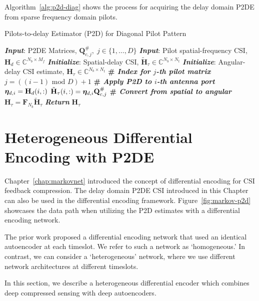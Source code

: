Algorithm~\ref{alg:p2d-diag} shows the process for acquiring the delay domain P2DE from sparse frequency domain pilots.

\begin{algorithm}
    \caption{Pilots-to-delay Estimator (P2D) for Diagonal Pilot Pattern} 
    \label{alg:p2d-diag}
    \begin{algorithmic}[1]
    \State \textbf{\emph{Input}}:
        P2DE Matrices, $\mathbf{Q}_{c,j}^\#,\;
        j\in\{1,\dots, D\}$
    \State \textbf{\emph{Input}}: Pilot spatial-frequency CSI, $\mathbf{H}_d\in\mathbb{C}^{N_b\times M_f}$
    \State \textbf{\emph{Initialize}}: Spatial-delay CSI, $\tilde{\mathbf{H}}_\tau\in\mathbb{C}^{N_b\times N_t}$
   \State \textbf{\emph{Initialize}}: Angular-delay CSI estimate, ${\mathbf{H}}_\tau
              \in\mathbb{C}^{N_b\times N_t}$
        \State \textbf{\# \emph{Index for $j$-th pilot matrix}}
        \State $j = ((i-1) \text{ mod } D) + 1$
        \State \textbf{\# \emph{Apply P2D to $i$-th antenna port}}
        \State ${\boldsymbol{\eta}}_{d,i} = \mathbf{H}_d(i,:)$
        \State $\tilde{{\mathbf{H}}}_{\tau}(i,:) = {\boldsymbol{\eta}}_{d,i}\mathbf{Q}^{\#}_{c,j}$
        \EndFor
        \State \textbf{\# \emph{Convert from spatial to angular}}
        \State ${{\mathbf{H}}}_{\tau}=\mathbf{F}_{N_b}\tilde{{\mathbf{H}}}_{\tau}$
        \State \textbf{\emph{Return}} ${{\mathbf{H}}}_{\tau}$
    \end{algorithmic} 
\end{algorithm}

\section{Heterogeneous Differential Encoding with P2DE}
\label{sect:hetero-markov}

Chapter~\ref{chap:markovnet} introduced the concept of differential encoding for CSI feedback compression. The delay domain P2DE CSI introduced in this Chapter can also be used in the differential encoding framework. Figure~\ref{fig:markov-p2d} showcases the data path when utilizing the P2D estimates with a differential encoding network.

The prior work proposed a differential encoding network that used an identical autoencoder at each timeslot. We refer to such a network as `homogeneous.' In contrast, we can consider a `heterogeneous' network, where we use different network architectures at different timeslots.

In this section, we describe a heterogeneous differential encoder which combines deep compressed sensing with deep autoencoders.

